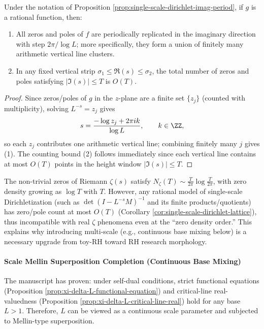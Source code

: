 \begin{corollary}\label{cor:single-scale-dirichlet-lattice}
Under the notation of Proposition \ref{prop:single-scale-dirichlet-imag-period}, if \(g\) is a rational function, then:
\begin{enumerate}
  \item All zeros and poles of \(f\) are periodically replicated in the imaginary direction with step \(2\pi/\log L\); more specifically, they form a union of finitely many arithmetic vertical line clusters.
  \item In any fixed vertical strip \(\sigma_1\le \Re(s)\le \sigma_2\), the total number of zeros and poles satisfying \(|\Im(s)|\le T\) is \(O(T)\).
\end{enumerate}
\end{corollary}
\begin{proof}
Since zeros/poles of \(g\) in the \(z\)-plane are a finite set \(\{z_j\}\) (counted with multiplicity), solving \(L^{-s}=z_j\) gives
\[
s=\frac{-\log z_j+2\pi i k}{\log L},\qquad k\in\ZZ,
\]
so each \(z_j\) contributes one arithmetic vertical line; combining finitely many \(j\) gives (1).
The counting bound (2) follows immediately since each vertical line contains at most \(O(T)\) points in the height window \(|\Im(s)|\le T\).
\end{proof}

\begin{remark}\label{rem:single-scale-dirichlet-obstruction}
The non-trivial zeros of Riemann \(\zeta(s)\) satisfy \(N_\zeta(T)\sim \frac{T}{2\pi}\log\frac{T}{2\pi}\), with zero density growing as \(\log T\) with \(T\).
However, any rational model of single-scale Dirichletization (such as \(\det(I-L^{-s}M)^{-1}\) and its finite products/quotients) has zero/pole count at most \(O(T)\) (Corollary \ref{cor:single-scale-dirichlet-lattice}), thus incompatible with real \(\zeta\) phenomena even at the ``zero density order.''
This explains why introducing multi-scale (e.g., continuous base mixing below) is a necessary upgrade from toy-RH toward RH research morphology.
\end{remark}



\paragraph{Scale Mellin Superposition Completion (Continuous Base Mixing)}
The manuscript has proven: under self-dual conditions, strict functional equations (Proposition \ref{prop:xi-delta-L-functional-equation}) and critical-line real-valuedness (Proposition \ref{prop:xi-delta-L-critical-line-real}) hold for any base \(L>1\).
Therefore, \(L\) can be viewed as a continuous scale parameter and subjected to Mellin-type superposition.

